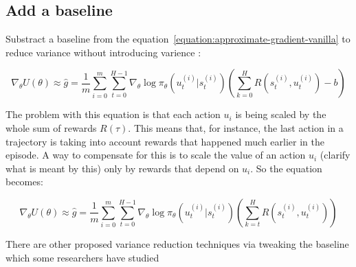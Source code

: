 \documentclass{../main.tex}{subfiles}
\begin{document}
\subsection{Add a baseline}
Substract a baseline from the equation~\ref{equation:approximate-gradient-vanilla} to reduce variance without introducing varience \citep{ Williams1992}:

\begin{equation}\label{equation:approximate-gradient-vanilla}
\nabla_{\theta}U(\theta) \approx \hat{g} = \frac{1}{m} \sum_{i = 0}^{m} \sum_{t=0}^{H-1} \nabla_{\theta} \log \pi_{\theta}(u_t^{(i)} | s_t^{(i)}) (\sum_{k=0}^{H}R(s_t^{(i)}, u_t^{(i)}) - b)
\end{equation}

The problem with this equation is that each action $u_i$ is being scaled by the whole sum of rewards $R(\tau)$. This means that, for instance, the last action in a trajectory is taking into account rewards that happened much earlier in the episode. A way to compensate for this is to scale the value of an action $u_i$ (clarify what is meant by this) only by rewards that depend on $u_i$. So the equation becomes:

\begin{equation}
\nabla_{\theta}U(\theta) \approx \hat{g} = \frac{1}{m} \sum_{i = 0}^{m} \sum_{t=0}^{H-1} \nabla_{\theta} \log \pi_{\theta}(u_t^{(i)} | s_t^{(i)}) (\sum_{k=t}^{H}R(s_t^{(i)}, u_t^{(i)}))
\end{equation}

There are other proposed variance reduction techniques via tweaking the baseline which some researchers have studied~\citep{Greensmith2004}
\end{document}
